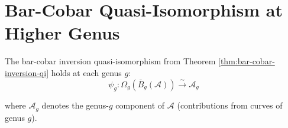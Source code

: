 

\section{Bar-Cobar Quasi-Isomorphism at Higher Genus}
\label{sec:bar-cobar-qi-higher-genus}

\begin{theorem}\label{thm:higher-genus-inversion}
The bar-cobar inversion quasi-isomorphism from Theorem \ref{thm:bar-cobar-inversion-qi} 
holds at each genus $g$:
$$\psi_g: \Omega_g(\bar{B}_g(\mathcal{A})) \xrightarrow{\sim} \mathcal{A}_g$$

where $\mathcal{A}_g$ denotes the genus-$g$ component of $\mathcal{A}$ (contributions 
from curves of genus $g$).
\end{theorem}

